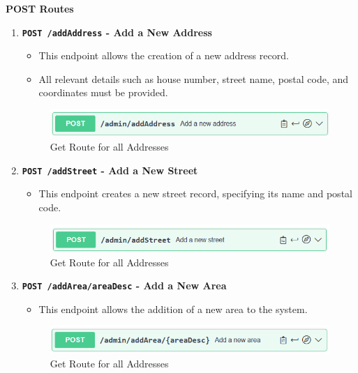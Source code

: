     \textbf{POST Routes}
    \begin{enumerate}
        \item \textbf{\texttt{POST /addAddress} - Add a New Address}
        \begin{itemize}
            \item This endpoint allows the creation of a new address record.
            \item All relevant details such as house number, street name, postal code, and coordinates must be provided.
        \end{itemize} 
        \begin{figure} [H]
            \centering
            \includegraphics [width=1\textwidth] {images/andreas/praxis/addAddress.png}
            \caption{Get Route for all Addresses}
        \end{figure}

        \item \textbf{\texttt{POST /addStreet} - Add a New Street}
        \begin{itemize}
            \item This endpoint creates a new street record, specifying its name and postal code.
        \end{itemize} 
        \begin{figure} [H]
            \centering
            \includegraphics [width=1\textwidth] {images/andreas/praxis/addStreet.png}
            \caption{Get Route for all Addresses}
        \end{figure}

        \item \textbf{\texttt{POST /addArea/{areaDesc}} - Add a New Area}
        \begin{itemize}
            \item This endpoint allows the addition of a new area to the system.
        \end{itemize} 
        \begin{figure} [H]
            \centering
            \includegraphics [width=1\textwidth] {images/andreas/praxis/addArea.png}
            \caption{Get Route for all Addresses}
        \end{figure}


\end{enumerate}

